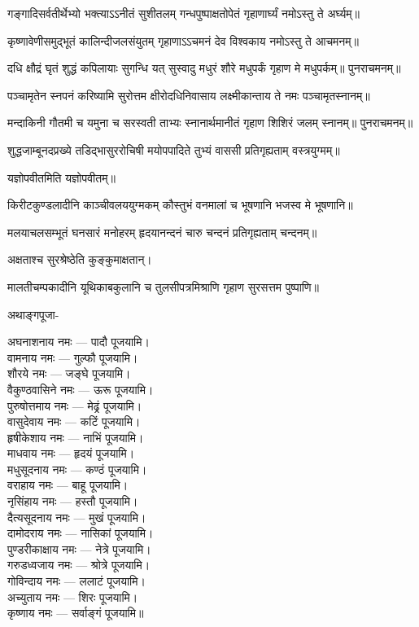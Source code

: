 \twolineshloka
{गङ्गादिसर्वतीर्थेभ्यो भक्त्याऽऽनीतं सुशीतलम्}
{गन्धपुष्पाक्षतोपेतं गृहाणार्घ्यं नमोऽस्तु ते}
अर्घ्यम्॥

\twolineshloka
{कृष्णावेणीसमुद्भूतं कालिन्दीजलसंयुतम्}
{गृहाणाऽऽचमनं देव विश्वकाय नमोऽस्तु ते}
आचमनम्॥

\twolineshloka
{दधि क्षौद्रं घृतं शुद्धं कपिलायाः सुगन्धि यत्}
{सुस्वादु मधुरं शौरे मधुपर्कं गृहाण मे}
मधुपर्कम्॥
पुनराचमनम्॥

\twolineshloka
{पञ्चामृतेन स्नपनं करिष्यामि सुरोत्तम}
{क्षीरोदधिनिवासाय लक्ष्मीकान्ताय ते नमः}
पञ्चामृतस्नानम्॥

\twolineshloka
{मन्दाकिनी गौतमी च यमुना च सरस्वती}
{ताभ्यः स्नानार्थमानीतं गृहाण शिशिरं जलम्}
स्नानम्॥
पुनराचमनम्॥

\twolineshloka
{शुद्धजाम्बूनदप्रख्ये तडिद्भासुररोचिषी}
{मयोपपादिते तुभ्यं वाससी प्रतिगृह्यताम्}
वस्त्रयुग्मम्॥

यज्ञोपवीतमिति यज्ञोपवीतम्॥

\twolineshloka
{किरीटकुण्डलादीनि काञ्चीवलययुग्मकम्}
{कौस्तुभं वनमालां च भूषणानि भजस्व मे}
भूषणानि॥

\twolineshloka
{मलयाचलसम्भूतं घनसारं मनोहरम्}
{हृदयानन्दनं चारु चन्दनं प्रतिगृह्यताम्}
चन्दनम्॥

अक्षताश्च सुरश्रेष्ठेति कुङ्कुमाक्षतान्।

\twolineshloka
{मालतीचम्पकादीनि यूथिकाबकुलानि च}
{तुलसीपत्रमिश्राणि गृहाण सुरसत्तम}
पुष्पाणि॥


अथाङ्गपूजा-

अघनाशनाय नमः — पादौ पूजयामि।\\
वामनाय नमः — गुल्फौ पूजयामि।\\
शौरये नमः — जङ्घे पूजयामि।\\
वैकुण्ठवासिने नमः — ऊरू पूजयामि।\\
पुरुषोत्तमाय नमः — मेढ्रं पूजयामि।\\
वासुदेवाय नमः — कटिं पूजयामि।\\
हृषीकेशाय नमः — नाभिं पूजयामि।\\
माधवाय नमः — हृदयं पूजयामि।\\
मधुसूदनाय नमः — कण्ठं पूजयामि।\\
वराहाय नमः — बाहू पूजयामि।\\
नृसिंहाय नमः — हस्तौ पूजयामि।\\
दैत्यसूदनाय नमः — मुखं पूजयामि।\\
दामोदराय नमः — नासिकां पूजयामि।\\
पुण्डरीकाक्षाय नमः — नेत्रे पूजयामि।\\
गरुडध्वजाय नमः — श्रोत्रे पूजयामि।\\
गोविन्दाय नमः — ललाटं पूजयामि।\\
अच्युताय नमः — शिरः पूजयामि।\\
कृष्णाय नमः — सर्वाङ्गं पूजयामि॥\\


